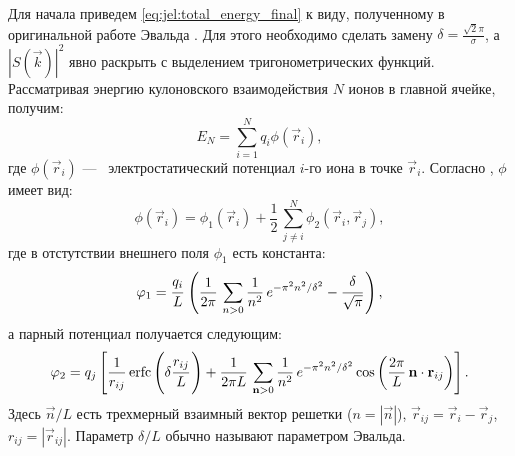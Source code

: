 Для начала приведем \eqref{eq:jel:total_energy_final} к виду, полученному в оригинальной работе Эвальда \cite{ewald:summation_original}.
Для этого необходимо сделать замену $\delta = \frac{\sqrt{2} \pi}{\sigma}$, а $| S (\vec{k}) |^2$ явно раскрыть с выделением тригонометрических функций.
Рассматривая энергию кулоновского взаимодействия $N$ ионов в главной ячейке, получим:
\begin{equation}
    \label{eq:mean:E_coloumb_main-cell}
    E_N = \sum\limits_{i=1}^{N} q_i \phi (\vec{r}_{i}),
\end{equation}
где $\phi (\vec{r}_{i})$ ---~ электростатический потенциал $i$-го иона в точке $\vec{r}_{i}$.
Согласно \cite{ewald:summation_original}, $\phi$ имеет вид:
\begin{equation}
    \label{eq:mean:phi_as_sum}
    \phi (\vec{r}_{i}) = \phi_1 (\vec{r}_{i}) + \frac{1}{2}\, \sum\limits_{j \neq i}^{N} \phi_2 (\vec{r}_{i}, \vec{r}_{j}),
\end{equation}
где в отстутствии внешнего поля $\phi_1$ есть константа:
\begin{equation}
    \label{eq:mean:phi_1}
    \phi_1 = \cfrac{q_{i}}{L}\, \left( \frac{1}{2\pi}\, \sum\limits_{n > 0}^{} \frac{1}{n^2}\, e^{-\pi^2 n^2 / \delta^2} - \cfrac{\delta}{\sqrt{\pi}}\, \right),
\end{equation}
а парный потенциал получается следующим:
\begin{equation}
    \label{eq:mean:phi_2}
    \phi_2 = q_{j} \left[ \frac{1}{r_{ij}}\, \mathrm{erfc} \left( \delta \cfrac{r_{ij}}{L}\, \right) + \frac{1}{2\pi L}\, \sum\limits_{\vec{n} > 0}^{} \frac{1}{n^2}\, e^{-\pi^2 n^2 / \delta^2} \cos \left( \frac{2\pi}{L}\, \vec{n} \cdot \vec{r}_{ij} \right) \right].
\end{equation}
Здесь $\vec{n} / L$ есть трехмерный взаимный вектор решетки ($n = | \vec{n} |$), $\vec{r}_{ij} = \vec{r}_{i} - \vec{r}_{j}$, $r_{ij} = |\vec{r}_{ij}|$.
Параметр $\delta / L$ обычно называют параметром Эвальда.

